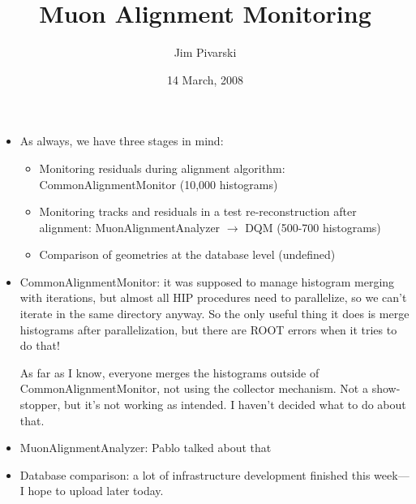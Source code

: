 \documentclass[compress]{beamer}
\title{Muon Alignment Monitoring}
\author{Jim Pivarski}
\institute{Texas A\&M University}
\date{14 March, 2008}
\begin{document}


\begin{frame}
\small
\begin{itemize}
\item As always, we have three stages in mind:
\begin{itemize}
\item Monitoring residuals during alignment algorithm: CommonAlignmentMonitor (10,000 histograms)
\item Monitoring tracks and residuals in a test re-reconstruction
after alignment: MuonAlignmentAnalyzer $\to$ DQM (500-700 histograms)
\item Comparison of geometries at the database level (undefined)
\end{itemize}

\item CommonAlignmentMonitor: it was supposed to manage histogram
merging with iterations, but almost all HIP procedures need to
parallelize, so we can't iterate in the same directory anyway.  So the
only useful thing it does is merge histograms after parallelization,
but there are ROOT errors when it tries to do that!

As far as I know, everyone merges the histograms outside of
CommonAlignmentMonitor, not using the collector mechanism.  Not a
show-stopper, but it's not working as intended.  I haven't decided
what to do about that.

\item MuonAlignmentAnalyzer: Pablo talked about that

\item Database comparison: a lot of infrastructure development finished
this week--- I hope to upload later today.

\end{itemize}
\end{frame}


\end{document}

